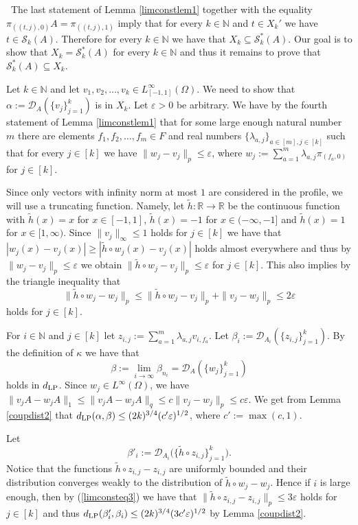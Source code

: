 \documentclass[a4wider]{amsart}
\theoremstyle{definitionbreak}\newtheorem{D}[theorem]{Definition}
\theoremstyle{definitionbreak}\newtheorem*{D*}{Definition}
\begin{document}
~The last statement of Lemma \ref{limconstlem1} together with the equality $\pi_{((t,j),0)}A=\pi_{((t,j),1)}$ imply that for every $k\in\mathbb{N}$ and $t\in X_k'$ we have  $t\in\mathcal{S}_k(A)$. Therefore for every $k\in\mathbb{N}$ we have that $X_k\subseteq \mathcal{S}_k^*(A)$. Our goal is to show that $X_k=\mathcal{S}_k^*(A)$ for every $k\in\mathbb{N}$ and thus it remains to prove that $\mathcal{S}_k^*(A)\subseteq X_k$.

Let $k\in\mathbb{N}$ and let $v_1,v_2,\dots,v_k\in L^\infty_{[-1,1]}(\Omega)$. We need to show that $\alpha:=\mathcal{D}_A(\{v_j\}_{j=1}^k)$ is in  $X_k$. Let $\varepsilon>0$ be arbitrary. We have by the fourth statement of Lemma \ref{limconstlem1} that for some large enough natural number $m$ there are elements $f_1, f_2, \dots, f_m\in F$ and real numbers $\{\lambda_{a,j}\}_{a\in [m],j\in [k]}$ such that for every $j\in [k]$ we have $\|w_j-v_j\|_p\leq\varepsilon$, where $w_j:=\sum_{a=1}^m \lambda_{a,j}\pi_{(f_a,0)}$ for $j\in [k]$.

Since only vectors with infinity norm at most $1$ are considered in the profile, we will use a truncating function. Namely, let $\tilde h:\mathbb{R}\to\mathbb{R}$ be the continuous function with $\tilde h(x)=x$ for $x\in[-1,1]$, $\tilde h(x)=-1$ for $x\in (-\infty,-1]$ and $\tilde h(x)=1$ for $x\in [1,\infty)$. Since $\|v_j\|_\infty\leq 1$ holds for $j\in [k]$ we have that $|w_j(x)-v_j(x)|\geq |\tilde h\circ w_j(x)-v_j(x)|$ holds almost everywhere and thus by $\|w_j-v_j\|_p\leq\varepsilon$ we obtain $\|\tilde h\circ w_j-v_j\|_p\leq\varepsilon$ for $j\in[k]$. This also implies by the triangle inequality that 
\begin{equation}\label{limconsteq3}
\|\tilde h\circ w_j-w_j\|_p\leq\|\tilde h\circ w_j-v_j\|_p+\|v_j-w_j\|_p\leq 2\varepsilon
\end{equation}
holds for $j\in [k]$.

For $i\in\mathbb{N}$ and $j\in[k]$ let $z_{i,j}:=\sum_{a=1}^m \lambda_{a,j}v_{i,f_a}$. Let $\beta_i:=\mathcal{D}_{A_i}(\{z_{i,j}\}_{j=1}^k)$. By the definition of $\kappa$ we have that  $$\beta:=\lim_{i\to\infty}\beta_{n_i}=\mathcal{D}_A(\{w_j\}_{j=1}^k)$$ holds in $d_{\rm LP}$. Since  $w_j\in L^{\infty}(\Omega)$, we have $\|v_jA-w_jA\|_1\leq \|v_jA-w_jA\|_q\leq c\|v_j-w_j\|_p\leq c\varepsilon$. We get from Lemma \ref{coupdist2} that $d_{\rm LP}(\alpha,\beta)\leq (2k)^{3/4}(c'\varepsilon)^{1/2}$, where $c':=\max(c,1)$.

Let 
$$\beta'_i:=\mathcal{D}_{A_i}\big(\{\tilde h\circ z_{i,j}\}_{j=1}^k).$$
Notice that the functions $\tilde h\circ z_{i,j}-z_{i,j}$ are uniformly bounded and their distribution converges weakly to the distribution of $\tilde h\circ w_j-w_j$. Hence if $i$ is large enough, then by (\ref{limconsteq3}) we have that $\|\tilde h\circ z_{i,j}-z_{i,j}\|_p\leq 3\varepsilon$ holds for $j\in [k]$  and thus $d_{\rm LP}(\beta'_i,\beta_i)\leq (2k)^{3/4}(3c'\varepsilon)^{1/2}$ by Lemma \ref{coupdist2}. 
\end{document}
